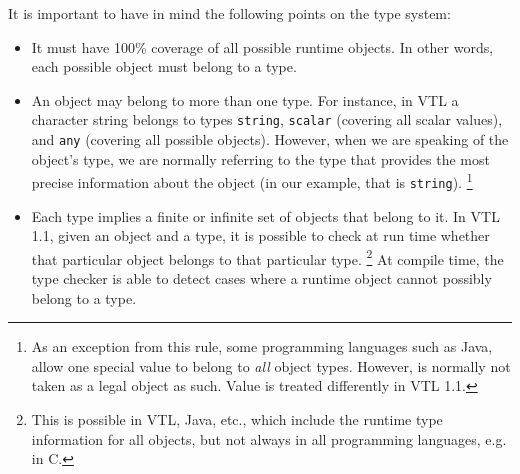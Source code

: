 \documentclass[droidmono,libertine,twoside,user,unofficial]{ecarticle}
\begin{document}
It is important to have in mind the following points on the type
system:
%
\begin{itemize}

\item It must have 100\% coverage of all possible runtime objects.  In
  other words, each possible object must belong to a type.

\item An object may belong to more than one type.  For instance, in
  VTL a character string belongs to types \texttt{string},
  \texttt{scalar} (covering all scalar values), and \texttt{any}
  (covering all possible objects). However, when we are speaking of
  the object's type, we are normally referring to the type that
  provides the most precise information about the object (in our
  example, that is \texttt{string}).  \footnote{As an exception from
    this rule, some programming languages such as Java, allow one
    special value  to belong to \emph{all} object types.
    However,  is normally not taken as a legal object as
    such.  Value  is treated differently in VTL 1.1.}



\item Each type implies a finite or infinite set of objects that
  belong to it.  In VTL 1.1, given an object and a type, it is
  possible to check at run time whether that particular object belongs
  to that particular type.%
  \footnote{This is possible in VTL, Java, etc., which include the
    runtime type information for all objects, but not always in all
    programming languages, e.g. in C.}
  At compile time, the type checker is able to detect cases where a
  runtime object cannot possibly belong to a type.
\end{itemize}
\end{document}
